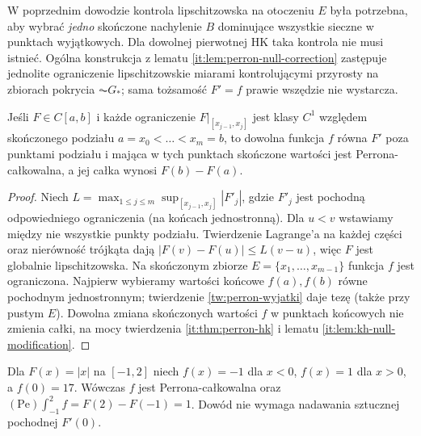 \begin{uwaga}
W poprzednim dowodzie kontrola lipschitzowska na otoczeniu $E$ była potrzebna, aby wybrać \emph{jedno} skończone nachylenie $B$ dominujące wszystkie sieczne w punktach wyjątkowych. Dla dowolnej pierwotnej HK taka kontrola nie musi istnieć. Ogólna konstrukcja z lematu \ref{it:lem:perron-null-correction} zastępuje jednolite ograniczenie lipschitzowskie miarami kontrolującymi przyrosty na zbiorach pokrycia $\AC G_*$; sama tożsamość $F'=f$ prawie wszędzie nie wystarcza.
\end{uwaga}
\begin{wniosek}\label{wn:perron-kawalkami}
Jeśli $F\in C[a,b]$ i każde ograniczenie $F|_{[x_{j-1},x_j]}$ jest klasy $C^1$ względem skończonego podziału $a=x_0<\dots<x_m=b$, to dowolna funkcja $f$ równa $F'$ poza punktami podziału i mająca w tych punktach skończone wartości jest Perrona-całkowalna, a jej całka wynosi $F(b)-F(a)$.
\end{wniosek}
\begin{proof}
Niech $L=\max_{1\le j\le m}\sup_{[x_{j-1},x_j]}|F'_j|$, gdzie $F'_j$ jest pochodną odpowiedniego ograniczenia (na końcach jednostronną). Dla $u<v$ wstawiamy między nie wszystkie punkty podziału. Twierdzenie Lagrange'a na każdej części oraz nierówność trójkąta dają $|F(v)-F(u)|\le L(v-u)$, więc $F$ jest globalnie lipschitzowska. Na skończonym zbiorze $E=\{x_1,\ldots,x_{m-1}\}$ funkcja $f$ jest ograniczona. Najpierw wybieramy wartości końcowe $f(a),f(b)$ równe pochodnym jednostronnym; twierdzenie \ref{tw:perron-wyjatki} daje tezę (także przy pustym $E$). Dowolna zmiana skończonych wartości $f$ w punktach końcowych nie zmienia całki, na mocy twierdzenia \ref{it:thm:perron-hk} i lematu \ref{it:lem:kh-null-modification}.
\end{proof}
\begin{przyklad}
Dla $F(x)=|x|$ na $[-1,2]$ niech $f(x)=-1$ dla $x<0$, $f(x)=1$ dla $x>0$, a $f(0)=17$. Wówczas $f$ jest Perrona-całkowalna oraz $(\mathrm{Pe})\int_{-1}^{2}f=F(2)-F(-1)=1$. Dowód nie wymaga nadawania sztucznej pochodnej $F'(0)$.
\end{przyklad}
